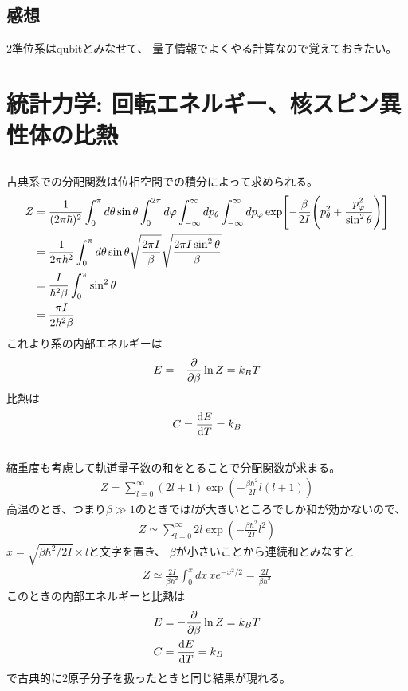 \documentclass[../../master.tex]{subfiles}
\begin{document}
\subsection*{感想}
2準位系はqubitとみなせて、
量子情報でよくやる計算なので覚えておきたい。

\section{統計力学: 回転エネルギー、核スピン異性体の比熱}
\subsection{}
古典系での分配関数は位相空間での積分によって求められる。
\begin{align}
    Z
    &= \frac{1}{(2\pi\hbar)^2}\int_{0}^{\pi}d\theta\sin\theta\int_{0}^{2\pi}d\varphi
        \int_{-\infty}^{\infty}dp_\theta \int_{-\infty}^{\infty}dp_{\varphi} \exp[
        -\frac{\beta}{2I}\qty(p_\theta^2+\frac{p_\varphi^2}{\sin^2\theta})]\\
    &= \frac{1}{2\pi\hbar^2}\int_{0}^{\pi}d\theta \sin\theta \sqrt{\frac{2\pi I}{\beta}} \sqrt{\frac{2\pi I \sin^2\theta}{\beta}}\\
    &= \frac{I}{\hbar^2\beta}\int_{0}^{\pi}\sin^2\theta\\
    &=\frac{\pi I}{2\hbar^2 \beta}
\end{align}
これより系の内部エネルギーは
\begin{align}
    E = -\pdv{\beta}\ln Z = k_BT
\end{align}
比熱は
\begin{align}
    C = \dv{E}{T} = k_B
\end{align}
\subsection{}
縮重度も考慮して軌道量子数の和をとることで分配関数が求まる。
\begin{align}
    Z = \sum_{l=0}^{\infty}(2l+1)\exp(-\frac{\beta\hbar^2}{2I}l(l+1))
\end{align}
高温のとき、つまり\(\beta\gg 1\)のときでは\(l\)が大きいところでしか和が効かないので、
\begin{align}
    Z \simeq \sum_{l=0}^{\infty} 2l\exp(-\frac{\beta\hbar^2}{2I}l^2)
\end{align}
\(x=\sqrt{\beta\hbar^2/2I}\times l\)と文字を置き、
\(\beta\)が小さいことから連続和とみなすと
\begin{align}
    Z \simeq \frac{2I}{\beta\hbar^2}\int_{0}^{x} dx\, xe^{-x^2/2} = \frac{2I}{\beta\hbar^2}
\end{align}
このときの内部エネルギーと比熱は
\begin{align}
    E &= -\pdv{\beta}\ln Z = k_B T\\
    C &= \dv{E}{T} = k_B
\end{align}
で古典的に2原子分子を扱ったときと同じ結果が現れる。
\end{document}
